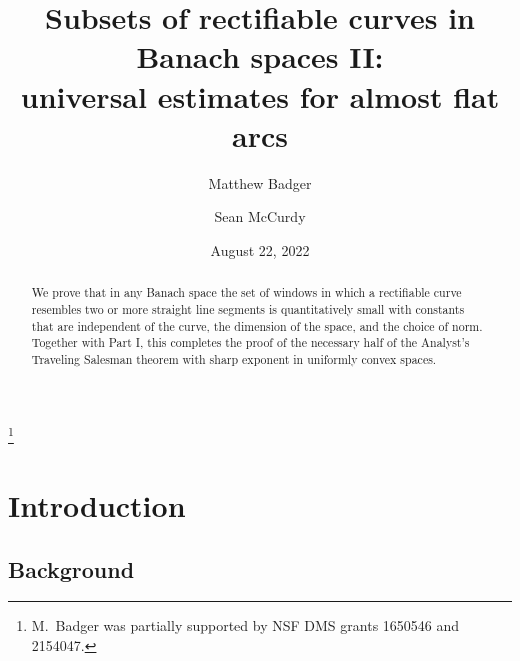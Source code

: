 \documentclass[12pt]{amsart}
\numberwithin{equation}{section}
\theoremstyle{plain}
\theoremstyle{definition}
\numberwithin{figure}{section}
\begin{document}
\title[Subsets of rectifiable curves in Banach spaces II]{Subsets of rectifiable curves in Banach spaces II:\\ universal estimates for almost flat arcs}

\author{Matthew Badger \and Sean McCurdy}
\thanks{M.~Badger was partially supported by NSF DMS grants 1650546 and 2154047.}
\date{August 22, 2022}

\address{Department of Mathematics\\ University of Connecticut\\ Storrs, CT 06269-1009}
\address{Department of Mathematics\\ National Taiwan Normal University\\ Taipei City\\ Taiwan (R.\,O.\,C.)}

\begin{abstract} We prove that in any Banach space the set of windows in which a rectifiable curve resembles two or more straight line segments is quantitatively small with constants that are independent of the curve, the dimension of the space, and the choice of norm. Together with Part I, this completes the proof of the necessary half of the Analyst's Traveling Salesman theorem with sharp exponent in uniformly convex spaces.
\end{abstract}

\maketitle

\vspace{-.32in}

\tableofcontents

\vspace{-.63in}

\listoffigures

\section{Introduction}\label{sec:intro}

\subsection{Background}
\end{document}
